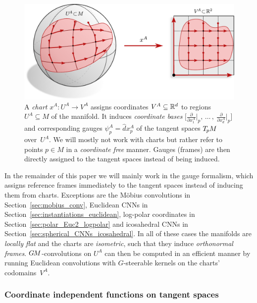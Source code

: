 \begin{figure}
    \centering
    \includegraphics[width=.86\textwidth]{figures/sphere_chart.pdf}
    \hspace*{4ex}
    \caption{\small
        A \emph{chart} $x^A: U^A \to V^A$ assigns coordinates $V^A \subseteq \mathbb{R}^d$ to regions $U^A \subseteq M$ of the manifold.
        It induces \emph{coordinate bases}
        $\big[\frac{\partial}{\partial x^A_1} \big|_p ,\,\dots\,,\ \frac{\partial}{\partial x^A_d} \big|_p \big]$
        and corresponding gauges $\psi_p^A = \hat{d}x_p^A$ of the tangent spaces $T_{\mkern-1.5mu p}\mkern-.5muM$ over~$U^A$.
        We will mostly not work with charts but rather refer to points $p\in M$ in a \emph{coordinate free} manner.
        Gauges (frames) are then directly assigned to the tangent spaces instead of being induced.
    }
    \label{fig:sphere_chart}
\end{figure}


In the remainder of this paper we will mainly work in the gauge formalism, which assigns reference frames immediately to the tangent spaces instead of inducing them from charts.
Exceptions are
the M\"obius convolutions in Section~\ref{sec:mobius_conv},
Euclidean CNNs in Section~\ref{sec:instantiations_euclidean},
log-polar coordinates in Section~\ref{sec:polar_Euc2_logpolar}
and icosahedral CNNs in Section~\ref{sec:spherical_CNNs_icosahedral}.
In all of these cases the manifolds are \emph{locally flat} and the charts are \emph{isometric}, such that they induce \emph{orthonormal frames}.
$G\mkern-1.4muM$-convolutions on $U^A$ can then be computed in an efficient manner by running Euclidean convolutions with $G$-steerable kernels on the charts' codomains~$V^A$.











\subsubsection{Coordinate independent functions on tangent spaces}
\label{sec:gauges_TpM_functions}

